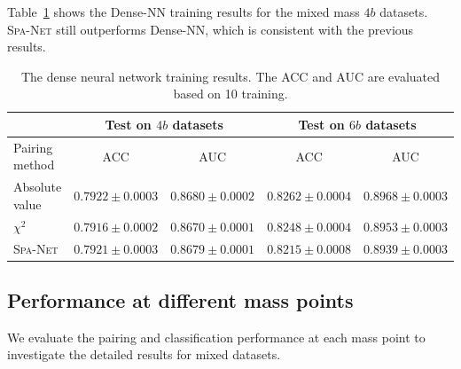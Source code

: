 \documentclass[12pt]{article}
\begin{document}
        Table~\ref{tab:DNN_training_results_mix_1M_4b} shows the Dense-NN training results for the mixed mass $4b$ datasets. \textsc{Spa-Net} still outperforms Dense-NN, which is consistent with the previous results.
        \begin{table}[htpb]
            \centering
            \caption{The dense neural network training results. The ACC and AUC are evaluated based on 10 training.}
            \label{tab:DNN_training_results_mix_1M_4b}
            \begin{tabular}{l|cc|cc}
                             & \multicolumn{2}{c|}{Test on $4b$ datasets}& \multicolumn{2}{c}{Test on $6b$ datasets} \\ \hline
            Pairing method   & ACC                 & AUC                 & ACC                 & AUC                 \\ \hline
            Absolute value   & $0.7922 \pm 0.0003$ & $0.8680 \pm 0.0002$ & $0.8262 \pm 0.0004$ & $0.8968 \pm 0.0003$ \\
            $\chi^2$         & $0.7916 \pm 0.0002$ & $0.8670 \pm 0.0001$ & $0.8248 \pm 0.0004$ & $0.8953 \pm 0.0003$ \\
            \textsc{Spa-Net} & $0.7921 \pm 0.0003$ & $0.8679 \pm 0.0001$ & $0.8215 \pm 0.0008$ & $0.8939 \pm 0.0003$
            \end{tabular}
        \end{table}
    \subsection{Performance at different mass points}%
    \label{sub:performance_at_different_mass_points}
        We evaluate the pairing and classification performance at each mass point to investigate the detailed results for mixed datasets.
\end{document}
